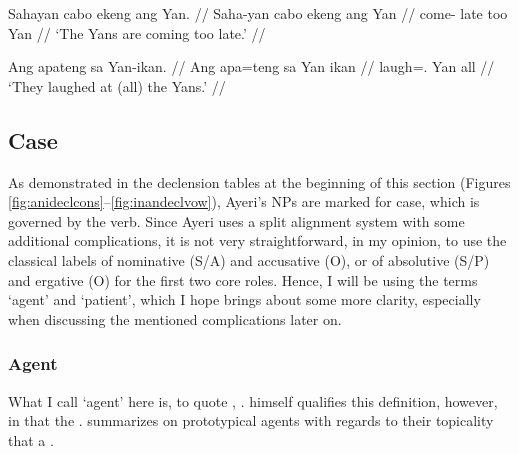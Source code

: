 \pex
\a\begingl
	\gla Sahayan cabo ekeng ang Yan. //
	\glb Saha-yan cabo ekeng ang Yan //
	\glc come-\TplM{} late too \Aarg{} Yan //
	\glft `The Yans are coming too late.' //
\endgl

\a\begingl
	\gla Ang apateng sa Yan-ikan. //
	\glb Ang apa=teng sa {Yan ikan} //
	\glc \AgtT{} laugh=\TplF{}.\Aarg{} \Parg{} {Yan all} //
	\glft `They laughed at (all) the Yans.' //
\endgl

\xe


\subsection{Case}
\label{subsec:case}

As demonstrated in the declension tables at the beginning of this section
(Figures \ref{fig:anideclcons}–\ref{fig:inandeclvow}), Ayeri's NPs are marked
for case, which is governed by the verb. Since Ayeri uses a split alignment
system with some additional complications, it is not very straightforward, in
my opinion, to use the classical labels of nominative (S/A) and accusative (O),
or of absolutive (S/P) and ergative (O) for the first two core roles. Hence, I
will be using the terms `agent' and `patient', which I hope brings about some
more clarity, especially when discussing the mentioned complications later on.


\subsubsection{Agent}

What I call `agent' here is, to quote \citet{fillmore1968},
. \citeauthor{fillmore1968}
himself qualifies this definition, however, in that the .
\citet{payne1997} summarizes on prototypical agents with regards to 
their topicality that a .

